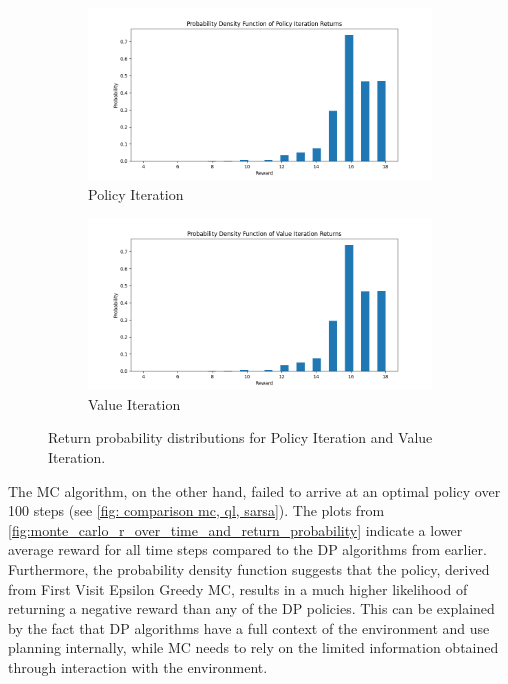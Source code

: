 \documentclass{class}
\begin{document}
\begin{figure}[H]
    \centering
    \begin{subfigure}[t]{0.48\linewidth}
        \centering
        \includegraphics[width=\linewidth]{../plots/return_probability/policy_iteration_return_probability.png}
        \caption{Policy Iteration}
        \label{fig:policy_iteration_return_probability}
    \end{subfigure}
    \hfill
    \begin{subfigure}[t]{0.48\linewidth}
        \centering
        \includegraphics[width=\linewidth]{../plots/return_probability/value_iteration_return_probability.png}
        \caption{Value Iteration}
        \label{fig:value_iterations_return_probability}
    \end{subfigure}
    \caption{Return probability distributions for Policy Iteration and Value Iteration.}
    \label{fig:DP_return_probability_comparison}
\end{figure}

\noindent The MC algorithm, on the other hand, failed to arrive at an optimal policy over 100 steps (see \autoref{fig: comparison mc, ql, sarsa}). The plots from \autoref{fig:monte_carlo_r_over_time_and_return_probability} indicate a lower average reward for all time steps compared to the DP algorithms from earlier. Furthermore, the probability density function suggests that the policy, derived from First Visit Epsilon Greedy MC, results in a much higher likelihood of returning a negative reward than any of the DP policies. This can be explained by the fact that DP algorithms have a full context of the environment and use planning internally, while MC needs to rely on the limited information obtained through interaction with the environment.
\end{document}
